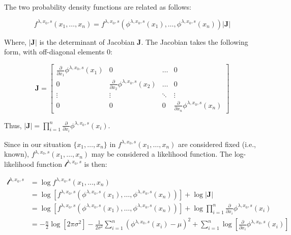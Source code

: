 \documentclass[preprint,12pt,authoryear]{elsarticle}
\begin{document}
The two probability density functions are related as follows:

\begin{equation}
f^{\lambda, x_0, s}(x_1, \ldots, x_n) = f^{\lambda, x_0, s} (\phi^{\lambda, x_0, s}(x_1), \ldots, \phi^{\lambda, x_0, s}(x_n)) \left|\mathbf{J}\right|
\end{equation}

Where, \(\left|\mathbf{J}\right|\) is the determinant of Jacobian
\(\mathbf{J}\). The Jacobian takes the following form, with off-diagonal
elements \(0\):

\begin{equation}
\mathbf{J} =
\begin{bmatrix}
    \frac{\partial}{\partial x_1} \phi^{\lambda, x_0, s}(x_1) & 0 & \dots & 0 \\
    0 & \frac{\partial}{\partial x_2} \phi^{\lambda, x_0, s}(x_2) & \dots & 0 \\
    \vdots & \vdots  & \ddots &  \vdots \\
    0  & 0 & 0 & \frac{\partial}{\partial x_n} \phi^{\lambda, x_0, s}(x_n)
\end{bmatrix}
\end{equation}

Thus,
\(\left| \mathbf{J} \right| = \prod_{i=1}^n \frac{\partial}{\partial x_i} \phi^{\lambda, x_0, s}(x_i)\).

Since in our situation \(\{x_1, \ldots, x_n\}\) in
\(f^{\lambda, x_0, s}(x_1, \ldots, x_n)\) are considered fixed (i.e.,
known), \(f^{\lambda, x_0, s}(x_1, \ldots, x_n)\) may be considered a
likelihood function. The log-likelihood function
\(\mathcal{l}^{\lambda, x_0, s}\) is then:

\begin{equation}
\begin{split}
\mathcal{l}^{\lambda, x_0, s} & = \log f^{\lambda, x_0, s}(x_1, \ldots, x_n) \\
 & = \log \left[ f^{\lambda, x_0, s} (\phi^{\lambda, x_0, s}(x_1), \ldots, \phi^{\lambda, x_0, s}(x_n)) \right] + \log \left|\mathbf{J}\right| \\
 & = \log \left[ f^{\lambda, x_0, s} (\phi^{\lambda, x_0, s}(x_1), \ldots, \phi^{\lambda, x_0, s}(x_n)) \right] + \log \prod_{i=1}^n \frac{\partial}{\partial x_i} \phi^{\lambda, x_0, s}(x_i) \\
 & = -\frac{n}{2} \log \left[2 \pi \sigma^2 \right] -\frac{1}{2 \sigma^2} \sum_{i=1}^n \left( \phi^{\lambda, x_0, s}(x_i) - \mu \right)^2 + \sum_{i=1}^n \log \left[ \frac{\partial}{\partial x_i} \phi^{\lambda, x_0, s}(x_i)\right]
\end{split}
\end{equation}
\end{document}
